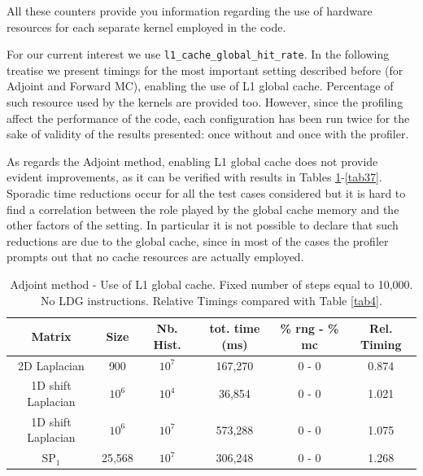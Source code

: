 \documentclass[a4paper,10pt]{article}
\begin{document}
All these counters provide you information regarding the use of hardware 
resources for each separate kernel employed in the code. 

For our current interest we use \texttt{l1\_cache\_global\_hit\_rate}. In the 
following treatise we present timings for the most important setting described 
before (for Adjoint and Forward MC), enabling the use of L1 global cache. 
Percentage of such resource used by the kernels are provided too. However, 
since 
the profiling affect the performance of the code, each configuration has been 
run twice for the sake of validity of the results presented: once without and 
once with the profiler. \newline

As regards the Adjoint method, enabling L1 global cache does not provide 
evident improvements, as it can be verified with results in Tables 
\ref{tab32}-\ref{tab37}. Sporadic time reductions occur for all the test cases 
considered but it is hard to find a correlation between the role played by the 
global cache memory and the other factors of the setting. In particular it is 
not possible to declare that such reductions are due to the global cache, since 
in most of the cases the profiler prompts out that no cache resources 
are actually employed. 


\begin{table}[!h]
\begin{tabular}{|c|c|c|c|c|c|}
\hline
\textbf{Matrix} & \textbf{Size} &\textbf{Nb. Hist.} & tot. time (ms)& \% rng - 
\% mc & Rel. Timing\\
\hline
2D Laplacian& 900 & $10^7$ & 167,270 & 0 - 0 & 0.874 \\
\hline 
1D shift Laplacian& $10^6$ & $10^4$ &  36,854 & 0 - 0 & 1.021\\
\hline
1D shift Laplacian& $10^6$ & $10^7$ & 573,288 & 0 - 0 & 1.075\\
\hline
$\text{SP}_1$ & 25,568 & $10^7$ & 306,248 & 0 - 0 & 1.268\\
\hline
\end{tabular}
\caption{Adjoint method - Use of L1 global cache. Fixed number of steps equal 
to 10,000. No LDG instructions. Relative Timings compared with Table 
\ref{tab4}.} 
\label{tab32}
\end{table}
\end{document}
